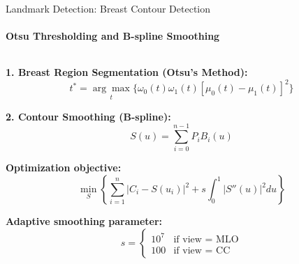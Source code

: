\documentclass[8pt,aspectratio=169,xcolor=dvipsnames]{beamer}
\begin{document}
\begin{frame}{Landmark Detection: Breast Contour Detection}
    \framesubtitle{Otsu Thresholding and B-spline Smoothing}
    
    \begin{columns}
        \begin{column}{0.55\textwidth}
            \footnotesize
            \textbf{1. Breast Region Segmentation (Otsu's Method):}
            \begin{equation}
            t^* = \underset{t}{\arg\max}\{\omega_0(t)\omega_1(t)[\mu_0(t) - \mu_1(t)]^2\}
            \end{equation}
        
            
            \vspace{0.2cm}
            
            \textbf{2. Contour Smoothing (B-spline):}
            \begin{equation}
            S(u) = \sum_{i=0}^{n-1} P_i B_i(u)
            \end{equation}
            
            \textbf{Optimization objective:}
            \begin{equation}
            \min_S \left\{ \sum_{i=1}^n |C_i - S(u_i)|^2 + s \int_0^1 |S''(u)|^2 du \right\}
            \end{equation}
            
            \textbf{Adaptive smoothing parameter:}
            \begin{equation}
            s = \begin{cases}
                10^7 & \text{if view = MLO} \\
                100 & \text{if view = CC}
            \end{cases}
            \end{equation}
        \end{column}
        

\end{columns}
\end{frame}
\end{document}
